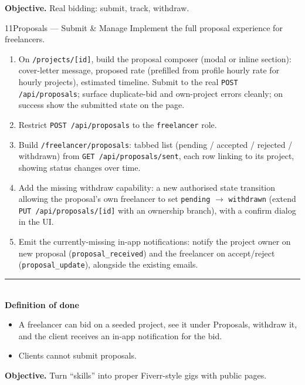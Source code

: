 \documentclass[11pt,a4paper]{article}
\newcommand{\dod}{\medskip\noindent\textcolor{donegreen}{\rule{\linewidth}{0.5pt}}\\[1mm]\textbf{\textcolor{donegreen}{Definition of done}}\\[-2mm]}
\newcommand{\objective}[1]{\noindent\textbf{Objective.} #1\medskip}
\begin{document}
\objective{Real bidding: submit, track, withdraw.}

\begin{promptbox}{11}{Proposals --- Submit \& Manage}
Implement the full proposal experience for freelancers.

\begin{enumerate}[leftmargin=1.6em]
  \item On \texttt{/projects/[id]}, build the proposal composer (modal or inline
        section): cover-letter message, proposed rate (prefilled from profile
        hourly rate for hourly projects), estimated timeline. Submit to the real
        \texttt{POST /api/proposals}; surface duplicate-bid and own-project errors
        cleanly; on success show the submitted state on the page.
  \item Restrict \texttt{POST /api/proposals} to the \texttt{freelancer} role.
  \item Build \texttt{/freelancer/proposals}: tabbed list (pending / accepted /
        rejected / withdrawn) from \texttt{GET /api/proposals/sent}, each row linking
        to its project, showing status changes over time.
  \item Add the missing withdraw capability: a new authorised state transition
        allowing the proposal's own freelancer to set \texttt{pending}
        $\rightarrow$ \texttt{withdrawn} (extend \texttt{PUT /api/proposals/[id]}
        with an ownership branch), with a confirm dialog in the UI.
  \item Emit the currently-missing in-app notifications: notify the project owner on
        new proposal (\texttt{proposal\_received}) and the freelancer on
        accept/reject (\texttt{proposal\_update}), alongside the existing emails.
\end{enumerate}

\dod
\begin{itemize}[leftmargin=1.6em]
  \item A freelancer can bid on a seeded project, see it under Proposals, withdraw
        it, and the client receives an in-app notification for the bid.
  \item Clients cannot submit proposals.
\end{itemize}
\end{promptbox}

\objective{Turn ``skills'' into proper Fiverr-style gigs with public pages.}
\end{document}
